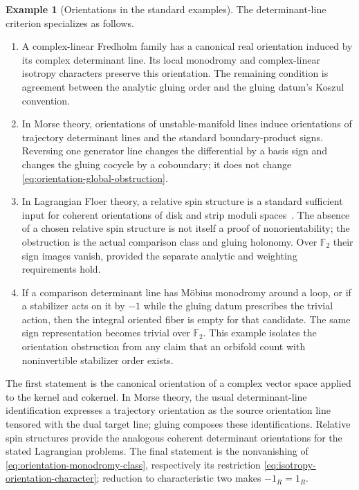 \documentclass[11pt,letterpaper,twoside]{article}
\theoremstyle{plain}
\theoremstyle{definition}
\newtheorem{example}[theorem]{Example}
\theoremstyle{remark}
\let\cite\citep
\begin{document}
\begin{example}[Orientations in the standard examples]\label{ex:orientation-examples}
The determinant-line criterion specializes as follows.
\begin{enumerate}
\item A complex-linear Fredholm family has a canonical real orientation induced by its complex determinant line.  Its local monodromy and complex-linear isotropy characters preserve this orientation.  The remaining condition is agreement between the analytic gluing order and the gluing datum's Koszul convention.
\item In Morse theory, orientations of unstable-manifold lines induce orientations of trajectory determinant lines and the standard boundary-product signs.  Reversing one generator line changes the differential by a basis sign and changes the gluing cocycle by a coboundary; it does not change \eqref{eq:orientation-global-obstruction}.
\item In Lagrangian Floer theory, a relative spin structure is a standard sufficient input for coherent orientations of disk and strip moduli spaces~\cite{fooo2009,seidel2008}.  The absence of a chosen relative spin structure is not itself a proof of nonorientability; the obstruction is the actual comparison class and gluing holonomy.  Over $\mathbb F_2$ their sign images vanish, provided the separate analytic and weighting requirements hold.
\item If a comparison determinant line has M\"obius monodromy around a loop, or if a stabilizer acts on it by $-1$ while the gluing datum prescribes the trivial action, then the integral oriented fiber is empty for that candidate.  The same sign representation becomes trivial over $\mathbb F_2$.  This example isolates the orientation obstruction from any claim that an orbifold count with noninvertible stabilizer order exists.
\end{enumerate}
The first statement is the canonical orientation of a complex vector space applied to the kernel and cokernel.  In Morse theory, the usual determinant-line identification expresses a trajectory orientation as the source orientation line tensored with the dual target line; gluing composes these identifications.  Relative spin structures provide the analogous coherent determinant orientations for the stated Lagrangian problems.  The final statement is the nonvanishing of \eqref{eq:orientation-monodromy-class}, respectively its restriction \eqref{eq:isotropy-orientation-character}; reduction to characteristic two makes $-1_R=1_R$.
\end{example}
\end{document}
